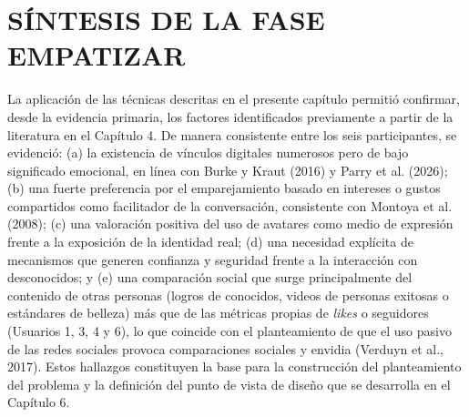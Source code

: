 \section{SÍNTESIS DE LA FASE EMPATIZAR}
La aplicación de las técnicas descritas en el presente capítulo permitió confirmar, desde la evidencia primaria, los factores identificados previamente a partir de la literatura en el Capítulo 4. De manera consistente entre los seis participantes, se evidenció: (a) la existencia de vínculos digitales numerosos pero de bajo significado emocional, en línea con Burke y Kraut (2016) y Parry et al. (2026); (b) una fuerte preferencia por el emparejamiento basado en intereses o gustos compartidos como facilitador de la conversación, consistente con Montoya et al. (2008); (c) una valoración positiva del uso de avatares como medio de expresión frente a la exposición de la identidad real; (d) una necesidad explícita de mecanismos que generen confianza y seguridad frente a la interacción con desconocidos; y (e) una comparación social que surge principalmente del contenido de otras personas (logros de conocidos, videos de personas exitosas o estándares de belleza) más que de las métricas propias de \textit{likes} o seguidores (Usuarios 1, 3, 4 y 6), lo que coincide con el planteamiento de que el uso pasivo de las redes sociales provoca comparaciones sociales y envidia (Verduyn et al., 2017). Estos hallazgos constituyen la base para la construcción del planteamiento del problema y la definición del punto de vista de diseño que se desarrolla en el Capítulo 6.